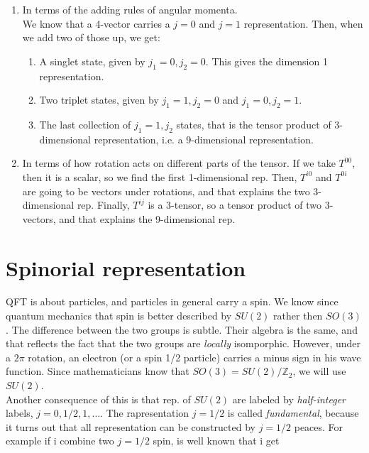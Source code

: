 \documentclass{report}
\begin{document}
\begin{enumerate}
    \item In terms of the adding rules of angular momenta. \\
    We know that a 4-vector carries a \(j=0\) and \(j = 1\) representation. Then, when we add two of those up, we get: 
    \begin{enumerate}
        \item A singlet state, given by \(j_1 = 0, j_2 = 0\). This gives the dimension 1 representation. 
        \item Two triplet states, given by \(j_1 = 1, j_2 = 0\) and \(j_1 = 0, j_2 = 1\). 
        \item The last collection of \(j_1 = 1, j_2\) states, that is the tensor product of 3-dimensional representation, i.e. a 9-dimensional representation. 
    \end{enumerate}
    \item In terms of how rotation acts on different parts of the tensor. If we take \(T^{00}\), then it is a scalar, so we find the first 1-dimensional rep. Then, \(T^{i0}\) and \(T^{0i}\) are going to be vectors under rotations, and that explains the two 3-dimensional rep. Finally, \(T^{ij}\) is a 3-tensor, so a tensor product of two 3-vectors, and that explains the 9-dimensional rep. 
\end{enumerate}


\section{Spinorial representation}

QFT is about particles, and particles in general carry a spin. We know since quantum mechanics that spin is better described by \(SU(2)\) rather then \(SO(3)\). The difference between the two groups is subtle. Their algebra is the same, and that reflects the fact that the two groups are \emph{locally} isomporphic. However, under a \(2\pi\) rotation, an electron (or a spin 1/2 particle) carries a minus sign in his wave function. Since mathematicians know that \(SO(3) = SU(2)/ \mathbb{Z}_2\), we will use \(SU(2)\). \\

Another consequence of this is that rep. of \(SU(2)\) are labeled by \emph{half-integer} labels, \(j = 0, 1/2, 1, \ldots\). The rapresentation \(j= 1/2\) is called \emph{fundamental}, because it turns out that all representation can be constructed by \(j = 1/2\) peaces. For example if i combine two \(j= 1/2\) spin, is well known that i get 
\end{document}

